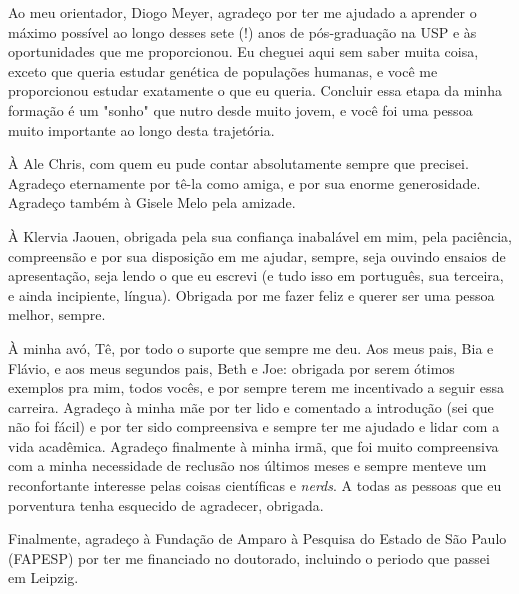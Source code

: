 Ao meu orientador, Diogo Meyer, agradeço por ter me ajudado a aprender o máximo possível ao longo desses sete (!) anos de pós-graduação na USP e às oportunidades que me proporcionou. Eu cheguei aqui sem saber muita coisa, exceto que queria estudar genética de populações humanas, e você me proporcionou estudar exatamente o que eu queria. Concluir essa etapa da minha formação é um "sonho" que nutro desde muito jovem, e você foi uma pessoa muito importante ao longo desta trajetória. 

À Ale Chris, com quem eu pude contar absolutamente sempre que precisei. Agradeço eternamente por tê-la como amiga, e por sua enorme generosidade. Agradeço também à Gisele Melo pela amizade.


À Klervia Jaouen, obrigada pela sua confiança inabalável em mim, pela paciência, compreensão e por sua disposição em me ajudar, sempre, seja ouvindo ensaios de apresentação, seja lendo o que eu escrevi (e tudo isso em português, sua terceira, e ainda incipiente, língua). Obrigada por me fazer feliz e querer ser uma pessoa melhor, sempre.

À minha avó, Tê, por todo o suporte que sempre me deu. Aos meus pais, Bia e Flávio, e aos meus segundos pais, Beth e Joe: obrigada por serem ótimos exemplos pra mim, todos vocês, e por sempre terem me incentivado a seguir essa carreira. Agradeço à minha mãe por ter lido e comentado a introdução (sei que não foi fácil) e por ter sido compreensiva e sempre ter me ajudado e lidar com a vida acadêmica. Agradeço finalmente à minha irmã, que foi muito compreensiva com a minha necessidade de reclusão nos últimos meses e sempre menteve um reconfortante interesse pelas coisas científicas e \emph{nerds}. A todas as pessoas que eu porventura tenha esquecido de agradecer, obrigada.

Finalmente, agradeço à Fundação de Amparo à Pesquisa do Estado de São Paulo (FAPESP) por ter me financiado no doutorado, incluindo o periodo que passei em Leipzig.

\newpage
%
\clearpage

